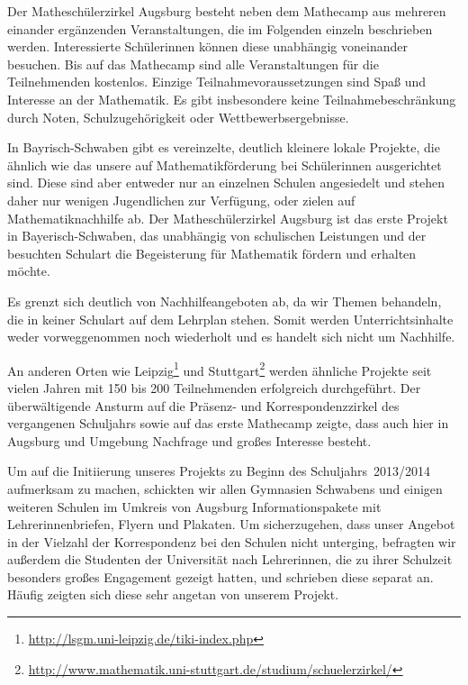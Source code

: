 \documentclass[12pt]{zettel}
\begin{document}
\newpage

Der Matheschülerzirkel Augsburg besteht neben dem Mathecamp aus mehreren einander ergänzenden Veranstaltungen, die im
Folgenden einzeln beschrieben werden. Interessierte Schülerinnen
können diese unabhängig voneinander besuchen. Bis auf das Mathecamp sind alle
Veranstaltungen für die Teilnehmenden kostenlos. Einzige
Teilnahmevoraussetzungen sind Spaß und Interesse an der Mathematik. Es gibt
insbesondere keine Teilnahmebeschränkung durch Noten, Schulzugehörigkeit oder
Wettbewerbsergebnisse.

In Bayrisch-Schwaben gibt es vereinzelte, deutlich kleinere lokale
Projekte, die ähnlich wie das unsere auf Mathematikförderung bei Schülerinnen ausgerichtet sind. Diese sind aber entweder nur an einzelnen Schulen
angesiedelt und stehen daher nur wenigen Jugendlichen zur Verfügung, oder zielen
auf Mathematiknachhilfe ab. Der Matheschülerzirkel Augsburg ist das erste
Projekt in Bayerisch-Schwaben, das unabhängig von schulischen Leistungen und der besuchten Schulart die
Begeisterung für Mathematik fördern und erhalten möchte.

Es grenzt sich deutlich von Nachhilfeangeboten ab, da wir Themen behandeln, die in keiner Schulart auf dem Lehrplan stehen. Somit werden Unterrichtsinhalte weder
vorweggenommen noch wiederholt und es handelt sich nicht um Nachhilfe.

An anderen Orten wie Leipzig\footnote{\href{http://lsgm.uni-leipzig.de/tiki-index.php}{\textsf{http:/\!/lsgm.uni-leipzig.de/tiki-index.php}}} und
Stuttgart\footnote{\href{http://www.mathematik.uni-stuttgart.de/studium/schuelerzirkel/}{\textsf{http:/\!/www.mathematik.uni-stuttgart.de/studium/schuelerzirkel/}}}
werden ähnliche Projekte seit
vielen Jahren mit 150 bis 200 Teilnehmenden erfolgreich durchgeführt. Der überwältigende Ansturm auf die Präsenz- und Korrespondenzzirkel des vergangenen Schuljahrs sowie auf das
erste Mathecamp zeigte, dass auch hier in Augsburg und Umgebung Nachfrage und großes Interesse besteht.

Um auf die Initiierung unseres Projekts zu Beginn des Schuljahrs~2013/2014
aufmerksam zu machen, schickten wir allen Gymnasien Schwabens und einigen
weiteren Schulen im Umkreis von Augsburg Informationspakete mit Lehrerinnenbriefen,
Flyern und Plakaten. Um sicherzugehen, dass unser Angebot in der
Vielzahl der Korrespondenz bei den Schulen nicht unterging, befragten wir außerdem
die Studenten der Universität nach Lehrerinnen, die zu ihrer Schulzeit
besonders großes Engagement gezeigt hatten, und schrieben diese separat an.
Häufig zeigten sich diese sehr angetan von unserem Projekt.
\end{document}

